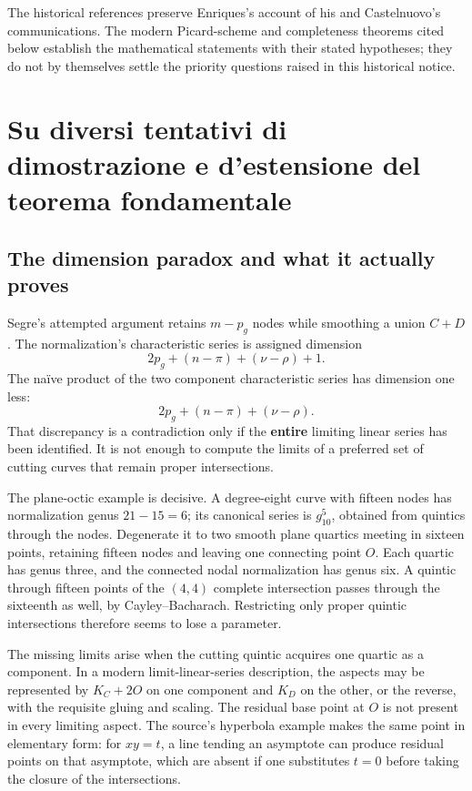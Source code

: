 The historical references preserve Enriques's account of his and Castelnuovo's communications. The modern Picard-scheme and completeness theorems cited below establish the mathematical statements with their stated hypotheses; they do not by themselves settle the priority questions raised in this historical notice.

\section{Su diversi tentativi di dimostrazione e d'estensione del teorema fondamentale}\label{cp2-ix-7}

\subsection{The dimension paradox and what it actually proves}\label{cp2-ix-7-1}

Segre's attempted argument retains \(m-p_g\) nodes while smoothing a union \(C+D\). The normalization's characteristic series is assigned dimension
\[
2p_g+(n-\pi)+(\nu-\rho)+1.
\]
The naïve product of the two component characteristic series has dimension one less:
\[
2p_g+(n-\pi)+(\nu-\rho).
\]
That discrepancy is a contradiction only if the \textbf{entire} limiting linear series has been identified. It is not enough to compute the limits of a preferred set of cutting curves that remain proper intersections.

The plane-octic example is decisive. A degree-eight curve with fifteen nodes has normalization genus \(21-15=6\); its canonical series is \(g^5_{10}\), obtained from quintics through the nodes. Degenerate it to two smooth plane quartics meeting in sixteen points, retaining fifteen nodes and leaving one connecting point \(O\). Each quartic has genus three, and the connected nodal normalization has genus six. A quintic through fifteen points of the \((4,4)\) complete intersection passes through the sixteenth as well, by Cayley--Bacharach. Restricting only proper quintic intersections therefore seems to lose a parameter.

The missing limits arise when the cutting quintic acquires one quartic as a component. In a modern limit-linear-series description, the aspects may be represented by \(K_C+2O\) on one component and \(K_D\) on the other, or the reverse, with the requisite gluing and scaling. The residual base point at \(O\) is not present in every limiting aspect. The source's hyperbola example makes the same point in elementary form: for \(xy=t\), a line tending an asymptote can produce residual points on that asymptote, which are absent if one substitutes \(t=0\) before taking the closure of the intersections.

